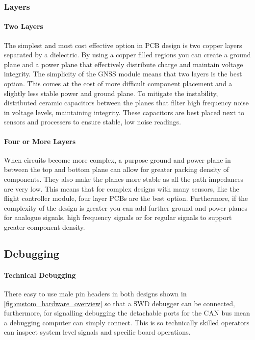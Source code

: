 \subsubsection{Layers}\label{sub_sub_section:tgt_layers}
\paragraph{Two Layers}
The simplest and most cost effective option in \gls{PCB} design is two copper layers separated by a dielectric. By using a copper filled regions you can create a ground plane and a power plane that effectively distribute charge and maintain voltage integrity. The simplicity of the \gls{GNSS} module means that two layers is the best option. This comes at the cost of more difficult component placement and a slightly less stable power and ground plane. To mitigate the instability, distributed ceramic capacitors between the planes that filter high frequency noise in voltage levels, maintaining integrity. These capacitors are best placed next to sensors and processers to ensure stable, low noise readings.
\paragraph{Four or More Layers}
When circuits become more complex, a purpose ground and power plane in between the top and bottom plane can allow for greater packing density of components. They also make the planes more stable as all the path impedances are very low. This means that for complex designs with many sensors, like the flight controller module, four layer \gls{PCB}s are the best option. Furthermore, if the complexity of the design is greater you can add further ground and power planes for analogue signals, high frequency signals or for regular signals to support greater component density.

\subsection{Debugging}\label{sub_sub_section:debugging}
\paragraph{Technical Debugging}
There easy to use male pin headers in both designs shown in \ref{fig:custom_hardware_overview} so that a \gls{SWD} debugger can be connected, furthermore, for signalling debugging the detachable ports for the \gls{CAN} bus mean a debugging computer can simply connect. This is so technically skilled operators can inspect system level signals and specific board operations.
